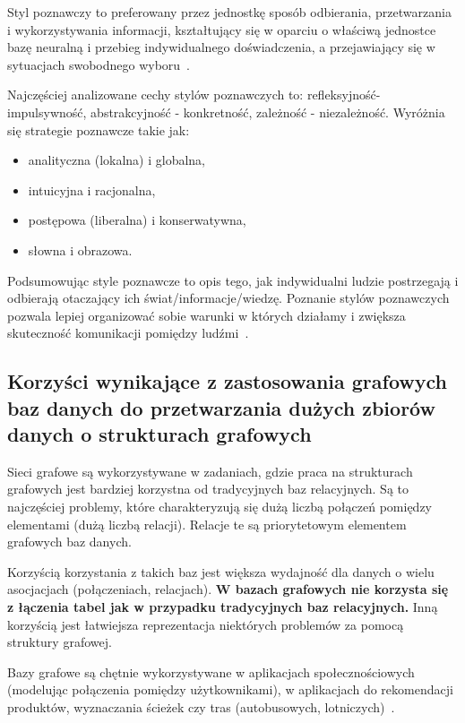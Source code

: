 \documentclass[wi]{zut}
\begin{document}
Styl poznawczy to preferowany przez jednostkę sposób odbierania, przetwarzania i wykorzystywania informacji, kształtujący się w oparciu o właściwą jednostce bazę neuralną i przebieg indywidualnego doświadczenia, a przejawiający się w sytuacjach swobodnego wyboru~\cite{bator1991wyznaczniki}.

Najczęściej analizowane cechy stylów poznawczych to: refleksyjność-impulsywność, abstrakcyjność - konkretność, zależność - niezależność. Wyróżnia się strategie poznawcze takie jak:

\begin{itemize}
    \item analityczna (lokalna) i globalna,
    \item intuicyjna i racjonalna,
    \item postępowa (liberalna) i konserwatywna,
    \item słowna i obrazowa.
\end{itemize}

Podsumowując style poznawcze to opis tego, jak indywidualni ludzie postrzegają i odbierają otaczający ich świat/informacje/wiedzę. Poznanie stylów poznawczych pozwala lepiej organizować sobie warunki w których działamy i zwiększa skuteczność komunikacji pomiędzy ludźmi~\cite{perso_style}.


\subsection{Korzyści wynikające z zastosowania grafowych baz danych do przetwarzania dużych zbiorów danych o strukturach grafowych}

Sieci grafowe są wykorzystywane w zadaniach, gdzie praca na strukturach grafowych jest bardziej korzystna od tradycyjnych baz relacyjnych. Są to najczęściej problemy, które charakteryzują się dużą liczbą połączeń pomiędzy elementami (dużą liczbą relacji). Relacje te są priorytetowym elementem grafowych baz danych.

Korzyścią korzystania z takich baz jest większa wydajność dla danych o wielu asocjacjach (połączeniach, relacjach). \textbf{W bazach grafowych nie korzysta się z łączenia tabel jak w przypadku tradycyjnych baz relacyjnych.} Inną korzyścią jest łatwiejsza reprezentacja niektórych problemów za pomocą struktury grafowej.

Bazy grafowe są chętnie wykorzystywane w aplikacjach społecznościowych (modelując połączenia pomiędzy użytkownikami), w aplikacjach do rekomendacji produktów, wyznaczania ścieżek czy tras (autobusowych, lotniczych)~\cite{grafowe}. 
\end{document}
